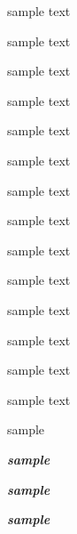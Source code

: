 \documentclass[12pt,twocolumn]{amsart}
\begin{document}
{\Tiny sample text}\par
{\tiny sample text}\par
{\SMALL sample text}\par
{\Small sample text}\par
{\small sample text}\par
{\normalsize sample text}\par
{\large sample text}\par
{\Large sample text}\par
{\LARGE sample text}\par
{\huge sample text}\par
{\Huge sample text}\par
sample text\par
{\smaller[1]sample text}\par
sample text\par
\medskip
sample\par
{\slshape\bfseries sample\par}
{\sl\bf sample\par}
{\bf\sl sample\par}
\end{document}
